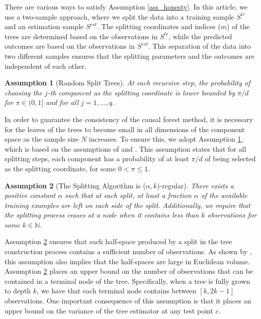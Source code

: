 \documentclass[12pt]{article}
\newtheorem{assump}{Assumption}[section]
\begin{document}
There are various ways to satisfy Assumption \ref{ass_honesty}. In this article, we use a two-sample approach, where we split the data into a training sample $S^{tr}$ and an estimation sample $S^{est}$. The splitting coordinates and indices ($m$) of the trees are determined based on the observations in $S^{tr}$, while the predicted outcomes are based on the observations in $S^{est}$. This separation of the data into two different samples ensures that the splitting parameters and the outcomes are independent of each other.


\begin{assump}[Random Split Trees]\label{ass_randsplit}
At each recursive step, the probability of choosing the $j$-th component as the splitting coordinate is lower bounded by $\pi/d$ for $\pi \in (0, 1]$ and for all $j = 1, \dots, q$.
\end{assump}

In order to guarantee the consistency of the causal forest method, it is necessary for the leaves of the trees to become small in all dimensions of the component space as the sample size $N$ increases. To ensure this, we adopt Assumption \ref{ass_randsplit}, which is based on the assumptions of \cite{meinshausen2006quantile} and \cite{wager2018estimation}. This assumption states that for all splitting steps, each component has a probability of at least $\pi/d$ of being selected as the splitting coordinate, for some $0 < \pi \leq 1$. 

\begin{assump}[The Splitting Algorithm is ($\alpha, k$)-regular]\label{ass_regul}
There exists a positive constant $\alpha$ such that at each split, at least a fraction $\alpha$ of the available training examples are left on each side of the split. Additionally, we require that the splitting process ceases at a node when it contains less than $k$ observations for some $k\in \mathbb{N}$.
\end{assump}

Assumption \ref{ass_regul} ensures that each half-space produced by a split in the tree construction process contains a sufficient number of observations. As shown by \cite{wager2015adaptive}, this assumption also implies that the half-spaces are large in Euclidean volume. Assumption \ref{ass_regul} places an upper bound on the number of observations that can be contained in a terminal node of the tree. Specifically, when a tree is fully grown to depth $k$, we have that each terminal node contains between $[k, 2k-1]$ observations. One important consequence of this assumption is that it places an upper bound on the variance of the tree estimator at any test point $c$.
\end{document}
